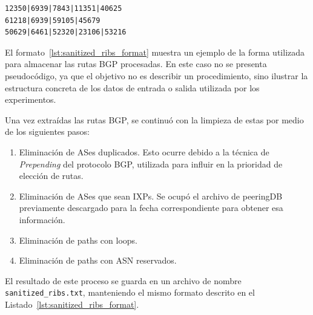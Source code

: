 {
\renewcommand{\lstlistingname}{Formato}
\begin{lstlisting}[caption={Ejemplo del formato del archivo \texttt{sanitized\_ribs.txt}}, label={lst:sanitized_ribs_format}]
12350|6939|7843|11351|40625
61218|6939|59105|45679
50629|6461|52320|23106|53216
\end{lstlisting}
}
El formato~\ref{lst:sanitized_ribs_format} muestra un ejemplo de la forma utilizada para almacenar las rutas BGP procesadas. En este caso no se presenta pseudocódigo, ya que el objetivo no es describir un procedimiento, sino ilustrar la estructura concreta de los datos de entrada o salida utilizada por los experimentos.


Una vez extraídas las rutas BGP, se continuó con la limpieza de estas por medio de los siguientes pasos: 

\begin{enumerate}
    \item Eliminación de ASes duplicados. Esto ocurre debido a la técnica de \textit{Prepending} del protocolo BGP, utilizada para influir en la prioridad de elección de rutas.
    \item Eliminación de ASes que sean IXPs.
    Se ocupó el archivo de peeringDB previamente descargado para la fecha correspondiente para obtener esa información.
    \item Eliminación de paths con loops.
    \item Eliminación de paths con ASN reservados.
\end{enumerate}

El resultado de este proceso se guarda en un archivo de nombre \texttt{sanitized\_ribs.txt}, manteniendo el mismo formato descrito en el Listado~\ref{lst:sanitized_ribs_format}.\\



